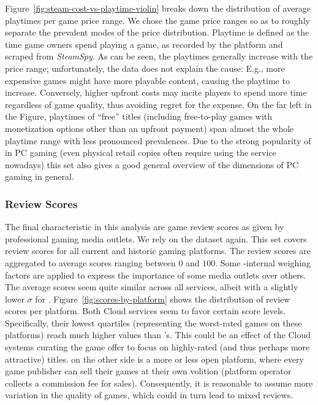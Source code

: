 Figure~\ref{fig:steam-cost-vs-playtime-violin} breaks down the distribution of average playtimes per game price range. We chose the game price ranges so as to roughly separate the prevalent modes of the price distribution. %
Playtime is defined as the time game owners spend playing a game, as recorded by the \steam platform and scraped from \textit{SteamSpy}. As can be seen, the playtimes generally increase with the price range; unfortunately, the data does not explain the cause: E.g., more expensive games might have more playable content, causing the playtime to increase. Conversely, higher upfront costs may incite players to spend more time regardless of game quality, thus avoiding regret for the expense. On the far left in the Figure, playtimes of ``free'' titles (including free-to-play games with monetization options other than an upfront payment) span almost the whole playtime range with less pronounced prevalences.
Due to the strong popularity of \steam in PC gaming (even physical retail copies often require using the service nowadays) this set also gives a good general overview of the dimensions of PC gaming in general.


\subsubsection{Review Scores}

The final characteristic in this analysis are game review scores as given by professional gaming media outlets. We rely on the \metacritic dataset again. This set covers review scores for all current and historic gaming platforms. The review scores are aggregated to average scores ranging between $0$ and $100$. Some \metacritic-internal weighing factors are applied to express the importance of some media outlets over others.
The average scores seem quite similar across all services, albeit with a slightly lower $\sigma$ for \gfnow. Figure~\ref{fig:scores-by-platform} shows the distribution of review scores per platform. Both Cloud services seem to favor certain score levels. Specifically, their lowest quartiles (representing the worst-rated games on these platforms) reach much higher values than \steam's. This could be an effect of the Cloud systems curating the game offer to focus on highly-rated (and thus perhaps more attractive) titles. \steam on the other side is a more or less open platform, where every game publisher can sell their games at their own volition (platform operator collects a commission fee for sales). Consequently, it is reasonable to assume more variation in the quality of games, which could in turn lead to mixed reviews.

